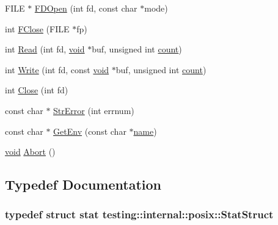 \begin{DoxyCompactItemize}
\item 
F\-I\-L\-E $\ast$ \hyperlink{namespacetesting_1_1internal_1_1posix_af7c268eba32d5a718b36b6b3801302e0}{F\-D\-Open} (int fd, const char $\ast$mode)
\item 
int \hyperlink{namespacetesting_1_1internal_1_1posix_af4beeaaa8d62916d5e3b644a1ddfbd6b}{F\-Close} (F\-I\-L\-E $\ast$fp)
\item 
int \hyperlink{namespacetesting_1_1internal_1_1posix_a3c6ab13e581a56f1b02f3eb7536c97fd}{Read} (int fd, \hyperlink{legacy_8hpp_a8bb47f092d473522721002c86c13b94e}{void} $\ast$buf, unsigned int \hyperlink{tracking_8hpp_a88d78b1935cd8bdee70a44eaaf326b1e}{count})
\item 
int \hyperlink{namespacetesting_1_1internal_1_1posix_af4acf9f78d55f815a18b43786511abef}{Write} (int fd, const \hyperlink{legacy_8hpp_a8bb47f092d473522721002c86c13b94e}{void} $\ast$buf, unsigned int \hyperlink{tracking_8hpp_a88d78b1935cd8bdee70a44eaaf326b1e}{count})
\item 
int \hyperlink{namespacetesting_1_1internal_1_1posix_a15e5b8f2a535ef1b2529b85b861e4846}{Close} (int fd)
\item 
const char $\ast$ \hyperlink{namespacetesting_1_1internal_1_1posix_a4b77b14af6f4d18f83d303b98e9349c4}{Str\-Error} (int errnum)
\item 
const char $\ast$ \hyperlink{namespacetesting_1_1internal_1_1posix_a1d5e3da5a27eed25986859fa83cafe95}{Get\-Env} (const char $\ast$\hyperlink{core__c_8h_add928d8eb85ea33a25a67db3406d4887}{name})
\item 
\hyperlink{legacy_8hpp_a8bb47f092d473522721002c86c13b94e}{void} \hyperlink{namespacetesting_1_1internal_1_1posix_a69b8278c59359dd6a6f941b4643db9fb}{Abort} ()
\end{DoxyCompactItemize}


\subsection{Typedef Documentation}
\hypertarget{namespacetesting_1_1internal_1_1posix_a8eb9f08d3af29941c2d2a964cfff3ecb}{
\subsubsection[{Stat\-Struct}]{\setlength{\rightskip}{0pt plus 5cm}typedef struct stat {\bf testing\-::internal\-::posix\-::\-Stat\-Struct}}}\label{namespacetesting_1_1internal_1_1posix_a8eb9f08d3af29941c2d2a964cfff3ecb}


